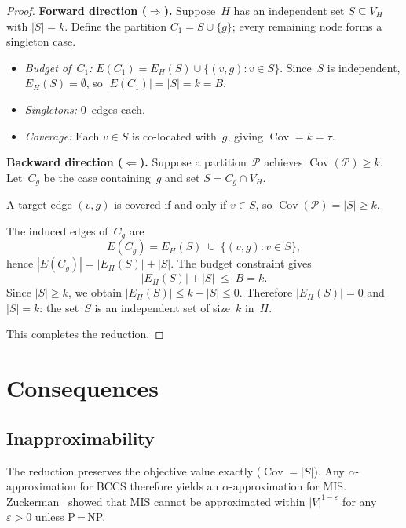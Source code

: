 \documentclass[11pt]{article}
\begin{document}
\begin{proof}
\medskip\noindent
\textbf{Forward direction ($\Rightarrow$).}\;
Suppose~$H$ has an independent set $S\subseteq V_H$ with $|S|=k$.
Define the partition $C_1=S\cup\{g\}$; every remaining node forms a
singleton case.

\begin{itemize}
\item \emph{Budget of~$C_1$:}\;
      $E(C_1)=E_H(S)\cup\{(v,g):v\in S\}$.
      Since~$S$ is independent, $E_H(S)=\emptyset$, so
      $|E(C_1)|=|S|=k=B$.\;\checkmark

\item \emph{Singletons:}\; $0$~edges each.\;\checkmark

\item \emph{Coverage:}\;
      Each $v\in S$ is co-located with~$g$, giving
      $\operatorname{Cov}=k=\tau$.\;\checkmark
\end{itemize}

\medskip\noindent
\textbf{Backward direction ($\Leftarrow$).}\;
Suppose a partition~$\mathcal{P}$ achieves
$\operatorname{Cov}(\mathcal{P})\ge k$.
Let~$C_g$ be the case containing~$g$ and set
$S=C_g\cap V_H$.

A target edge $(v,g)$ is covered if and only if $v\in S$, so
$\operatorname{Cov}(\mathcal{P})=|S|\ge k$.

The induced edges of~$C_g$ are
\[
  E(C_g) = E_H(S)\;\cup\;\{(v,g):v\in S\},
\]
hence $|E(C_g)|=|E_H(S)|+|S|$.
The budget constraint gives
\[
  |E_H(S)|+|S|\;\le\; B = k.
\]
Since $|S|\ge k$, we obtain $|E_H(S)|\le k-|S|\le 0$.
Therefore $|E_H(S)|=0$ and $|S|=k$:
the set~$S$ is an independent set of size~$k$ in~$H$.\;\checkmark

\medskip
This completes the reduction.
\end{proof}

\section{Consequences}

\subsection{Inapproximability}

The reduction preserves the objective value exactly
($\operatorname{Cov}=|S|$).  Any $\alpha$-approximation for BCCS
therefore yields an $\alpha$-approximation for MIS.
Zuckerman~\cite{zuckerman2007} showed that MIS cannot be approximated
within $|V|^{1-\varepsilon}$ for any $\varepsilon>0$ unless P\,=\,NP.
\end{document}
